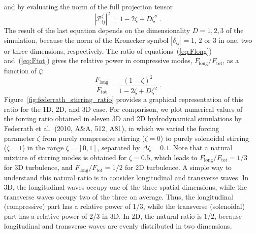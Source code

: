 and by evaluating the norm of the full projection tensor
\begin{equation} \label{eq:Ftot}
\left|\mathcal{P}_{ij}^\zeta\right|^2 = 1-2\zeta+D\zeta^2\;.
\end{equation}
The result of the last equation depends on the dimensionality $D=1,2,3$ of the simulation, because the
norm of the Kronecker symbol $|\delta_{ij}|=1,\,2$ or 3 in one, two or three dimensions, respectively.
The ratio of equations~(\ref{eq:Flong}) and~(\ref{eq:Ftot}) gives the relative power in compressive
modes, $F_\mathrm{long}/F_\mathrm{tot}$, as a function of $\zeta$:
\begin{equation} \label{eq:forcing_ratio}
\frac{F_\mathrm{long}}{F_\mathrm{tot}} = \frac{(1-\zeta)^2}{1-2\zeta+D\zeta^2}\;.
\end{equation}
Figure~\ref{fig:federrath_stirring_ratio} provides a graphical representation of this ratio for the
1D, 2D, and 3D case. For comparison, we plot numerical values of the forcing ratio obtained in eleven
3D and 2D hydrodynamical simulations by Federrath et al.~(2010, A\&A, 512, A81), in which we varied
the forcing parameter $\zeta$ from purely compressive stirring ($\zeta=0$) to purely solenoidal
stirring ($\zeta=1$) in the range $\zeta=[0,1]$, separated by $\Delta\zeta=0.1$. Note that a natural
mixture of stirring modes is obtained for $\zeta=0.5$, which leads to $F_\mathrm{long}/F_\mathrm{tot}=1/3$
for 3D turbulence, and $F_\mathrm{long}/F_\mathrm{tot}=1/2$ for 2D turbulence. A simple way to understand
this natural ratio is to consider longitudinal and transverse waves. In 3D, the longitudinal waves
occupy one of the three spatial dimensions, while the transverse waves occupy two of the three on
average. Thus, the longitudinal (compressive) part has a relative power of 1/3, while the transverse
(solenoidal) part has a relative power of 2/3 in 3D. In 2D, the natural ratio is 1/2, because
longitudinal and transverse waves are evenly distributed in two dimensions.

